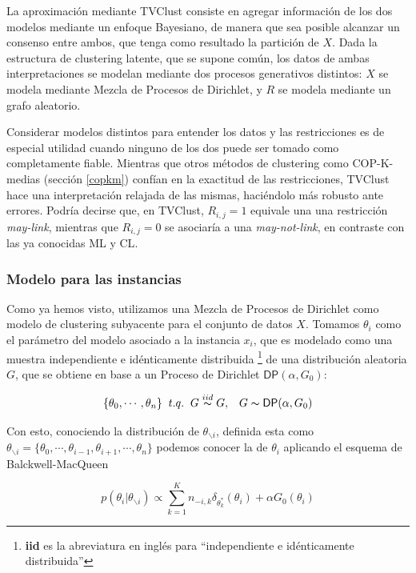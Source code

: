 La aproximación mediante \acs{TVClust} consiste en agregar información de los dos modelos mediante un enfoque Bayesiano, de manera que sea posible alcanzar un consenso entre ambos, que tenga como resultado la partición de $X$. Dada la estructura de clustering latente, que se supone común, los datos de ambas interpretaciones se modelan mediante dos procesos generativos distintos: $X$ se modela mediante Mezcla de Procesos de Dirichlet, y $R$ se modela mediante un grafo aleatorio.

Considerar modelos distintos para entender los datos y las restricciones es de especial utilidad cuando ninguno de los dos puede ser tomado como completamente fiable. Mientras que otros métodos de clustering como COP-K-medias (sección \ref{copkm}) confían en la exactitud de las restricciones, \acs{TVClust} hace una interpretación relajada de las mismas, haciéndolo más robusto ante errores. Podría decirse que, en \acs{TVClust}, $R_{i,j} = 1$ equivale una una restricción \textit{may-link}, mientras que $R_{i,j} = 0$ se asociaría a una \textit{may-not-link}, en contraste con las ya conocidas \acf{ML} y \acf{CL}.

\subsubsection{Modelo para las instancias}

Como ya hemos visto, utilizamos una Mezcla de Procesos de Dirichlet como modelo de clustering subyacente para el conjunto de datos $X$. Tomamos $\theta_i$ como el parámetro del modelo asociado
a la instancia $x_i$, que es modelado como una muestra independiente e idénticamente distribuida \footnote{\textbf{iid} es la abreviatura en inglés para ``independiente e idénticamente distribuida''} de una distribución aleatoria $G$, que se obtiene en base a un Proceso de Dirichlet $\mathsf{DP}(\alpha, G_0)$:

\begin{equation}
\{\theta_0, \cdots, \theta_n\} \;\; t.q. \;\; G \overset{iid}{\thicksim} G, \;\;\; G \thicksim \mathsf{DP}(\alpha, G_0)
\label{eqn44}
\end{equation}

Con esto, conociendo la distribución de $\theta_{\backslash i}$, definida esta como $\theta_{\backslash i} = \{\theta_0, \cdots, \theta_{i-1},\theta_{i+1}, \cdots,\theta_n\}$ podemos conocer la de $\theta_{i}$ aplicando el esquema de Balckwell-MacQueen \cite{Blackwell:1973}

\begin{equation}
p(\theta_{i}|\theta_{\backslash i}) \varpropto \sum_{k = 1}^{K} n_{-i,k} \delta_{\theta_{k}^*}(\theta_{i}) + \alpha G_0(\theta_{i})
\label{eqn45}
\end{equation}

